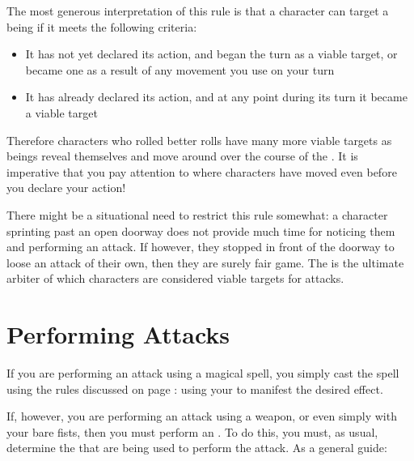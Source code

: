 The most generous interpretation of this rule is that a character can target a being if it meets the following criteria:
\begin{itemize}
	\item It has not yet declared its action, and began the turn as a viable target, or became one as a result of any movement you use on your turn
	\item It has already declared its action, and at any point during its turn it became a viable target
\end{itemize}

Therefore characters who rolled better  rolls have many more viable targets as beings reveal themselves and move around over the course of the . It is imperative that you pay attention to where characters have moved even before you declare your action!

There might be a situational need to restrict this rule somewhat: a character sprinting past an open doorway does not provide much time for noticing them and performing an attack. If however, they stopped in front of the doorway to loose an attack of their own, then they are surely fair game. The  is the ultimate arbiter of which characters are considered viable targets for attacks. 

\section{Performing Attacks}

If you are performing an attack using a magical spell, you simply cast the spell using the rules discussed on page \pageref{S:CastingChecks}: using your  to manifest the desired effect. 

If, however, you are performing an attack using a weapon, or even simply with your bare fists, then you must perform an . To do this, you must, as usual, determine the  that are being used to perform the attack. As a general guide:
\begin{itemize}
\end{itemize} 

